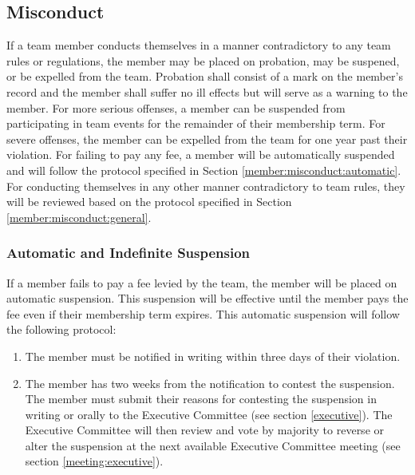 \documentclass[12pt,titlepage,letter]{article}
\begin{document}
\subsection{Misconduct \label{member:misconduct}}
If a team member conducts themselves in a manner contradictory to any team rules or regulations, the member may be placed on probation, may be suspened, or be expelled from the team. Probation shall consist of a mark on the member's record and the member shall suffer no ill effects but will serve as a warning to the member. For more serious offenses, a member can be suspended from participating in team events for the remainder of their membership term. For severe offenses, the member can be expelled from the team for one year past their violation.  For failing to pay any fee, a member will be automatically suspended and will follow the protocol specified in Section \ref{member:misconduct:automatic}. For conducting themselves in any other manner contradictory to team rules, they will be reviewed based on the protocol specified in Section \ref{member:misconduct:general}.

\subsubsection{Automatic and Indefinite Suspension \label{member:misconduct:automatic}}
If a member fails to pay a fee levied by the team, the member will be placed on automatic suspension. This suspension will be effective until the member pays the fee even if their membership term expires. This automatic suspension will follow the following protocol:
\begin{enumerate}
\item
The member must be notified in writing within three days of their violation.
\item
The member has two weeks from the notification to contest the suspension. The member must submit their reasons for contesting the suspension in writing or orally to the Executive Committee (see section \ref{executive}). The Executive Committee will then review and vote by majority to reverse or alter the suspension at the next available Executive Committee meeting (see section \ref{meeting:executive}).
\end{enumerate}
\end{document}
